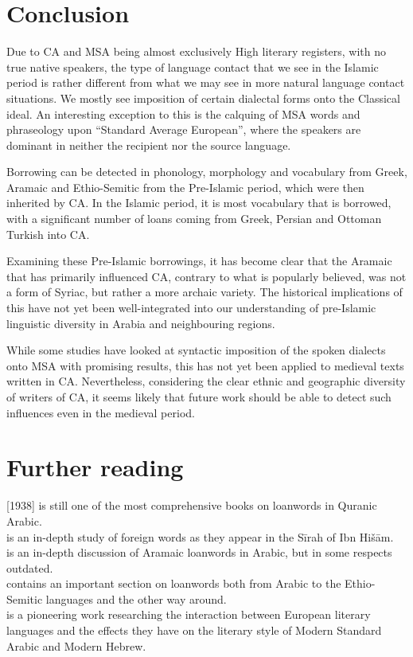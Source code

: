 \documentclass[output=paper]{langsci/langscibook}
\begin{document}
\section{Conclusion}

Due to CA and MSA being almost exclusively High literary registers, with no true native speakers, the type of language contact that we see in the Islamic period is rather different from what we may see in more natural language contact situations. We mostly see imposition of certain dialectal forms onto the Classical ideal. An interesting exception to this is the calquing of MSA words and phraseology upon “Standard Average European”, where the speakers are dominant in neither the recipient nor the source language.

Borrowing can be detected in phonology, morphology and vocabulary from Greek, Aramaic and Ethio-Semitic from the Pre-Islamic period, which were then inherited by CA. In the Islamic period, it is most vocabulary that is borrowed, with a significant number of loans coming from Greek, Persian and Ottoman Turkish into CA.

Examining these Pre-Islamic borrowings, it has become clear that the Aramaic that has primarily influenced CA, contrary to what is popularly believed, was not a form of Syriac, but rather a more archaic variety. The historical implications of this have not yet been well-integrated into our understanding of pre-Islamic linguistic diversity in Arabia and neighbouring regions.

While some studies have looked at syntactic imposition of the spoken dialects onto MSA with promising results, this has not yet been applied to medieval texts written in CA. Nevertheless, considering the clear ethnic and geographic diversity of writers of CA, it seems likely that future work should be able to detect such influences even in the medieval period.

\section*{Further reading}

\citet{Jeffrey2007} [1938] is still one of the most comprehensive books on loanwords in Quranic Arabic.\\
\citet{Hebbo1984} is an in-depth study of foreign words as they appear in the Sīrah of Ibn Hišām.\\
\citet{Fraenkel1886} is an in-depth discussion of Aramaic loanwords in Arabic, but in some respects outdated.\\
\citet{Nöldeke1910} contains an important section on loanwords both from Arabic to the Ethio-Semitic languages and the other way around.\\
\citet{Blau1969} is a pioneering work researching the interaction between European literary languages and the effects they have on the literary style of Modern Standard Arabic and Modern Hebrew.
\end{document}
